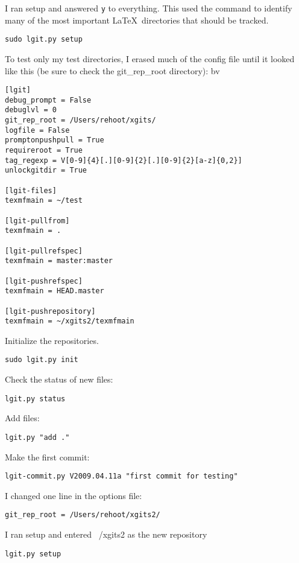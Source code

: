\documentclass{ltxdoc}
\def\ucmd#1{{\tt {#1}}}
\begin{document}
I ran setup and answered \ucmd{y} to everything.  This used the  command to identify many of the most important \LaTeX\ directories that should be tracked.
\begin{verbatim}
sudo lgit.py setup
\end{verbatim}

To test only my test directories, I erased much of the config file until it looked like this (be sure to check the git\_rep\_root directory):
bv
\begin{verbatim}
[lgit]
debug_prompt = False
debuglvl = 0
git_rep_root = /Users/rehoot/xgits/
logfile = False
promptonpushpull = True
requireroot = True
tag_regexp = V[0-9]{4}[.][0-9]{2}[.][0-9]{2}[a-z]{0,2}]
unlockgitdir = True

[lgit-files]
texmfmain = ~/test

[lgit-pullfrom]
texmfmain = .

[lgit-pullrefspec]
texmfmain = master:master

[lgit-pushrefspec]
texmfmain = HEAD.master

[lgit-pushrepository]
texmfmain = ~/xgits2/texmfmain
\end{verbatim}

Initialize the  repositories.
\begin{verbatim}
sudo lgit.py init
\end{verbatim}

Check the status of new files:
\begin{verbatim}
lgit.py status
\end{verbatim}

Add files:
\begin{verbatim}
lgit.py "add ."
\end{verbatim}


Make the first commit:
\begin{verbatim}
lgit-commit.py V2009.04.11a "first commit for testing"
\end{verbatim}

I changed one line in the options file:
\begin{verbatim}
git_rep_root = /Users/rehoot/xgits2/
\end{verbatim}

I ran setup and entered ~/xgits2 as the new repository
\begin{verbatim}
lgit.py setup
\end{verbatim}
\end{document}
